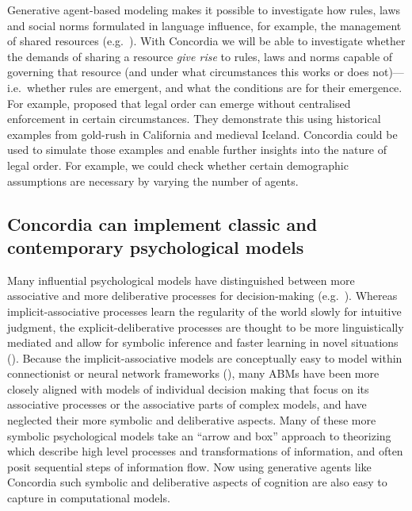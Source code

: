 \documentclass[11pt, a4paper, logo, twocolumn, internal, copyright, numbering]{googledeepmind}
\begin{document}
Generative agent-based modeling makes it possible to investigate how rules, laws and social norms formulated in language influence, for example, the management of shared resources (e.g.~\cite{yocum2023mitigating}). With Concordia we will be able to investigate whether the demands of sharing a resource \textit{give rise} to rules, laws and norms capable of governing that resource (and under what circumstances this works or does not)---i.e.~whether rules are emergent, and what the conditions are for their emergence. For example, \cite{hadfield2013law} proposed that legal order can emerge without centralised enforcement in certain circumstances. They demonstrate this using historical examples from gold-rush in California and medieval Iceland. Concordia could be used to simulate those examples and enable further insights into the nature of legal order. For example, we could check whether certain demographic assumptions are necessary by varying the number of agents.

\subsection{Concordia can implement classic and contemporary psychological models}

Many influential psychological models have distinguished between more associative and more deliberative processes for decision-making (e.g.~\cite{schneider1977controlled, kahneman2002representativeness, dayan2009goal}). Whereas implicit-associative processes learn the regularity of the world slowly for intuitive judgment, the explicit-deliberative processes are thought to be more linguistically mediated and allow for symbolic inference and faster learning in novel situations (\cite{greenwald1995implicit, wilson2000model}). Because the implicit-associative models are conceptually easy to model within connectionist or neural network frameworks (\cite{smith2009distributed}), many ABMs have been more closely aligned with models of individual decision making that focus on its associative processes or the associative parts of complex models, and have neglected their more symbolic and deliberative aspects. Many of these more symbolic psychological models take an ``arrow and box'' approach to theorizing which describe high level processes and transformations of information, and often posit sequential steps of information flow. Now using generative agents like Concordia such symbolic and deliberative aspects of cognition are also easy to capture in computational models.
\end{document}

